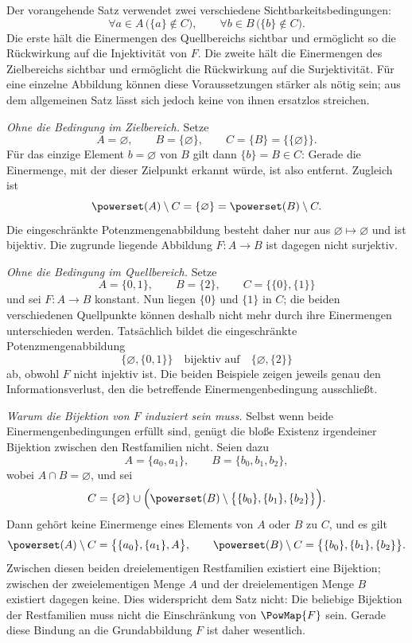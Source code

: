 \documentclass[main.tex]{subfiles}
\begin{document}
\begin{remark}
Der vorangehende Satz verwendet zwei verschiedene Sichtbarkeitsbedingungen:
\[
  \forall a\in A\,\bigl(\{a\}\notin C\bigr),\qquad
  \forall b\in B\,\bigl(\{b\}\notin C\bigr).
\]
Die erste hält die Einermengen des Quellbereichs sichtbar und ermöglicht so
die Rückwirkung auf die Injektivität von \(F\).  Die zweite hält die
Einermengen des Zielbereichs sichtbar und ermöglicht die Rückwirkung auf die
Surjektivität.  Für eine einzelne Abbildung können diese Voraussetzungen
stärker als nötig sein; aus dem allgemeinen Satz lässt sich jedoch keine von
ihnen ersatzlos streichen.

\emph{Ohne die Bedingung im Zielbereich.}
Setze
\[
  A=\varnothing,\qquad B=\{\varnothing\},\qquad
  C=\{B\}=\bigl\{\{\varnothing\}\bigr\}.
\]
Für das einzige Element \(b=\varnothing\) von \(B\) gilt dann
\(\{b\}=B\in C\): Gerade die Einermenge, mit der dieser Zielpunkt erkannt
würde, ist also entfernt.  Zugleich ist
\[
  \powerset(A)\setminus C
  =\{\varnothing\}
  =\powerset(B)\setminus C.
\]
Die eingeschränkte Potenzmengenabbildung besteht daher nur aus
\(\varnothing\mapsto\varnothing\) und ist bijektiv.  Die zugrunde liegende
Abbildung \(F\colon A\to B\) ist dagegen nicht surjektiv.

\emph{Ohne die Bedingung im Quellbereich.}
Setze
\[
  A=\{0,1\},\qquad B=\{2\},\qquad
  C=\bigl\{\{0\},\{1\}\bigr\}
\]
und sei \(F\colon A\to B\) konstant.  Nun liegen \(\{0\}\) und \(\{1\}\) in
\(C\); die beiden verschiedenen Quellpunkte können deshalb nicht mehr durch
ihre Einermengen unterschieden werden.  Tatsächlich bildet die
eingeschränkte Potenzmengenabbildung
\[
  \{\varnothing,\{0,1\}\}
    \quad\text{bijektiv auf}\quad
  \{\varnothing,\{2\}\}
\]
ab, obwohl \(F\) nicht injektiv ist.  Die beiden Beispiele zeigen jeweils
genau den Informationsverlust, den die betreffende Einermengenbedingung
ausschließt.

\emph{Warum die Bijektion von \(F\) induziert sein muss.}
Selbst wenn beide Einermengenbedingungen erfüllt sind, genügt die bloße
Existenz irgendeiner Bijektion zwischen den Restfamilien nicht.  Seien dazu
\[
  A=\{a_0,a_1\},\qquad B=\{b_0,b_1,b_2\},
\]
wobei \(A\cap B=\varnothing\), und sei
\[
  C=\{\varnothing\}\cup
    \Bigl(\powerset(B)\setminus
      \bigl\{\{b_0\},\{b_1\},\{b_2\}\bigr\}\Bigr).
\]
Dann gehört keine Einermenge eines Elements von \(A\) oder \(B\) zu \(C\),
und es gilt
\[
  \powerset(A)\setminus C
    =\bigl\{\{a_0\},\{a_1\},A\bigr\},\qquad
  \powerset(B)\setminus C
    =\bigl\{\{b_0\},\{b_1\},\{b_2\}\bigr\}.
\]
Zwischen diesen beiden dreielementigen Restfamilien existiert eine Bijektion;
zwischen der zweielementigen Menge \(A\) und der dreielementigen Menge \(B\)
existiert dagegen keine.  Dies widerspricht dem Satz nicht: Die beliebige
Bijektion der Restfamilien muss nicht die Einschränkung von \(\PowMap{F}\)
sein.  Gerade diese Bindung an die Grundabbildung \(F\) ist daher wesentlich.
\end{remark}
\end{document}
